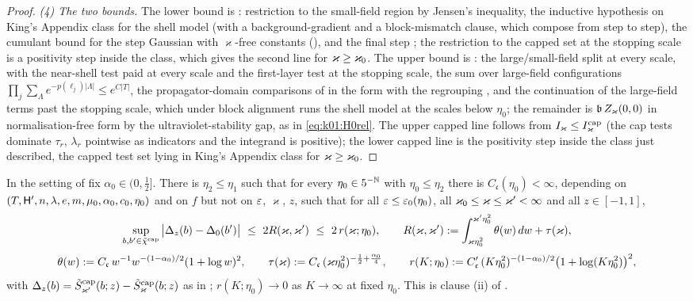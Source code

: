 \begin{proof}
\emph{(4) The two bounds.} The lower bound is \cite[\S\S3--4]{Ba1}: restriction to the small-field region by Jensen's inequality, the inductive hypothesis on King's Appendix class \cite[(A.1)--(A.8)]{K1} for the shell model (with a background-gradient and a block-mismatch clause, which compose from step to step), the cumulant bound for the step Gaussian with $\varkappa$-free constants (), and the final step \cite[(3.66)--(3.69)]{Ba1}; the restriction to the capped set at the stopping scale is a positivity step inside the class, which gives the second line for $\varkappa\ge\varkappa_0$. The upper bound is \cite[\S\S2--3]{Ba2}: the large/small-field split at every scale, with the near-shell test paid at every scale and the first-layer test at the stopping scale, the sum over large-field configurations $\prod_j\sum_\Lambda e^{-p(\ell_j)|\Lambda|}\le e^{C|T|}$, the propagator-domain comparisons of \cite[Prop.~2.6]{Ba2} in the form  with the regrouping , and the continuation of the large-field terms past the stopping scale, which under block alignment runs the shell model at the scales below $\eta_0$; the remainder is $\mathfrak b\,Z_\varkappa(0,0)$ in normalisation-free form by the ultraviolet-stability gap, as in \eqref{eq:k01:H0rel}. The upper capped line follows from $I_\varkappa\le I^{\mathrm{cap}}_\varkappa$ (the cap tests dominate $\tau_r$, $\lambda_r$ pointwise as indicators and the integrand is positive); the lower capped line is the positivity step inside the class just described, the capped test set lying in King's Appendix class for $\varkappa\ge\varkappa_0$.
\end{proof}

\begin{proposition}\label{rot:prop:SW3}
In the setting of  fix $\alpha_0\in(0,\frac12]$. There is $\eta_2\le\eta_1$ such that for every $\eta_0\in5^{-\mathbb N}$ with $\eta_0\le\eta_2$ there is $C_{\mathfrak c}(\eta_0)<\infty$, depending on $(T,\mathsf H',n,\lambda,e,m,\mu_0,\alpha_0,c_0,\eta_0)$ and on $f$ but not on $\varepsilon$, $\varkappa$, $z$, such that for all $\varepsilon\le\varepsilon_0(\eta_0)$, all $\varkappa_0\le\varkappa\le\varkappa'<\infty$ and all $z\in[-1,1]$,
\[
\sup_{b,b'\in\chicap}\big|\Delta_z(b)-\Delta_0(b')\big|\ \le\ 2R(\varkappa,\varkappa')\ \le\ 2\,r(\varkappa;\eta_0),\qquad
R(\varkappa,\varkappa')\defeq\int_{\varkappa\eta_0^2}^{\varkappa'\eta_0^2}\theta(w)\,dw+\tau(\varkappa),
\]
\[
\theta(w):= C_{\mathfrak c}\,w^{-1}w^{-(1-\alpha_0)/2}(1+\log w)^2,\qquad
\tau(\varkappa):= C_{\mathfrak c}\,(\varkappa\eta_0^2)^{-\frac12+\frac{\alpha_0}4},\qquad
r(K;\eta_0):= C'_{\mathfrak c}\,(K\eta_0^2)^{-(1-\alpha_0)/2}\big(1+\log(K\eta_0^2)\big)^2,
\]
with $\Delta_z(b)=\tilde S^{\mathrm{cap}}_{\varkappa'}(b;z)-\tilde S^{\mathrm{cap}}_\varkappa(b;z)$ as in ; $r(K;\eta_0)\to0$ as $K\to\infty$ at fixed $\eta_0$. This is clause \textup{(ii)} of .
\end{proposition}

